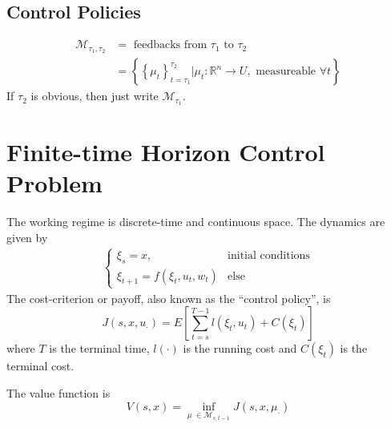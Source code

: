 \subsection{Control Policies}
\begin{align*}
\mathcal{M}_{\tau_1,\tau_2} &= \text{~feedbacks~from~} \tau_1 \text{~to~} \tau_2 \\
&= \left\lbrace\left\lbrace\mu_t\right\rbrace_{t=\tau_1}^{\tau_2} | \mu_t: \mathbb{R}^n \to U, \text{~measureable~} \forall t\right\rbrace
\end{align*}
If $\tau_2$ is obvious, then just write $\mathcal{M}_{\tau_1}$.

\section{Finite-time Horizon Control Problem}
The working regime is discrete-time and continuous space.
The dynamics are given by
\begin{align*}
\begin{cases}
\xi_s = x, & \text{initial conditions} \\
\xi_{t+1} = f(\xi_t,u_t,w_t) & \text{else}
\end{cases}
\end{align*}
The cost-criterion or payoff, also known as the ``control policy'', is
$$J(s,x,u_\cdot) = E\left[\sum_{t=s}^{T-1} l(\xi_t,u_t) + C(\xi_t)\right]$$
where $T$ is the terminal time, $l(\cdot)$ is the running cost and $C(\xi_t)$ is the terminal cost.

The value function is
$$V(s,x) = \inf_{\mu_\cdot\in\mathcal{M}_{s,t-1}}J(s,x,\mu_\cdot)$$%
